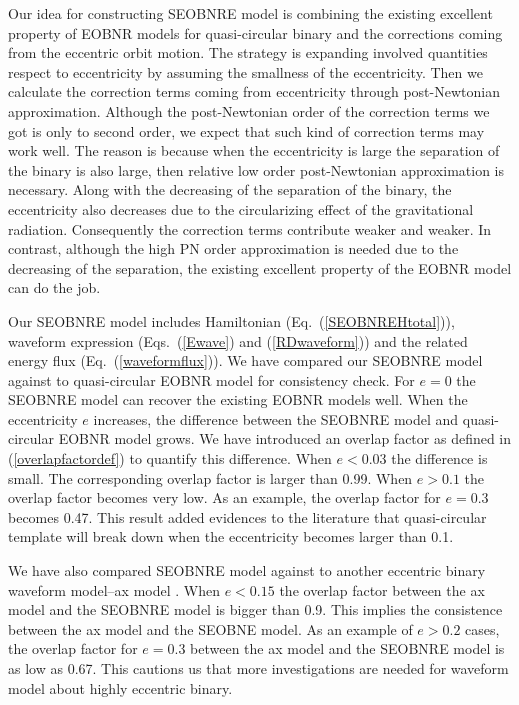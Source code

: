 \documentclass[prd,aps,a4paper,superscriptaddress,twocolumn,footinbib,showpacs]{revtex4}
\begin{document}
Our idea for constructing SEOBNRE model is combining the existing excellent property of EOBNR models for quasi-circular binary and the corrections coming from the eccentric orbit motion. The strategy is expanding involved quantities respect to eccentricity by assuming the smallness of the eccentricity. Then we calculate the correction terms coming from eccentricity through post-Newtonian approximation. Although the post-Newtonian order of the correction terms we got is only to second order, we expect that such kind of correction terms may work well. The reason is because when the eccentricity is large the separation of the binary is also large, then relative low order post-Newtonian approximation is necessary. Along with the decreasing of the separation of the binary, the eccentricity also decreases due to the circularizing effect of the gravitational radiation. Consequently the correction terms contribute weaker and weaker. In contrast, although the high PN order approximation is needed due to the decreasing of the separation, the existing excellent property of the EOBNR model can do the job.

Our SEOBNRE model includes Hamiltonian (Eq.~(\ref{SEOBNREHtotal})), waveform expression (Eqs.~(\ref{Ewave}) and (\ref{RDwaveform})) and the related energy flux (Eq.~(\ref{waveformflux})). We have compared our SEOBNRE model against to quasi-circular EOBNR model for consistency check. For $e=0$ the SEOBNRE model can recover the existing EOBNR models well. When the eccentricity $e$ increases, the difference between the SEOBNRE model and quasi-circular EOBNR model grows. We have introduced an overlap factor as defined in (\ref{overlapfactordef}) to quantify this difference. When $e<0.03$ the difference is small. The corresponding overlap factor is larger than 0.99. When $e>0.1$ the overlap factor becomes very low. As an example, the overlap factor for $e=0.3$ becomes 0.47. This result added evidences to the literature \cite{PhysRevD.92.044034} that quasi-circular template will break down when the eccentricity becomes larger than 0.1.

We have also compared SEOBNRE model against to another eccentric binary waveform model--ax model \cite{PhysRevD.95.024038}. When $e<0.15$ the overlap factor between the ax model and the SEOBNRE model is bigger than 0.9. This implies the consistence between the ax model and the SEOBNE model. As an example of $e>0.2$ cases, the overlap factor for $e=0.3$ between the ax model and the SEOBNRE model is as low as 0.67. This cautions us that more investigations are needed for waveform model about highly eccentric binary.
\end{document}
